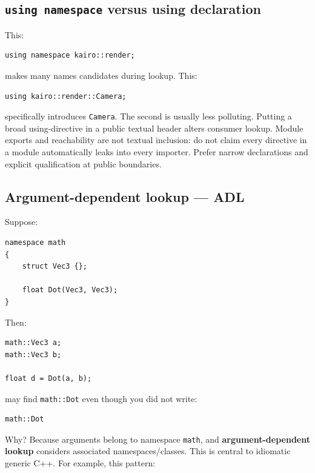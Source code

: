 \subsection{\texorpdfstring{\texttt{using\ namespace} versus using declaration}{using namespace versus using declaration}}\label{05-engine-i-ch002-using-namespace-versus-using-declaration}

This:

\begin{verbatim}
using namespace kairo::render;
\end{verbatim}

makes many names candidates during lookup. This:

\begin{verbatim}
using kairo::render::Camera;
\end{verbatim}

specifically introduces \texttt{Camera}. The second is usually less polluting. Putting a broad using-directive in a public textual header alters consumer lookup. Module exports and reachability are not textual inclusion: do not claim every directive in a module automatically leaks into every importer. Prefer narrow declarations and explicit qualification at public boundaries.

\subsection{Argument-dependent lookup --- ADL}\label{05-engine-i-ch002-argument-dependent-lookup-adl}

Suppose:

\begin{verbatim}
namespace math
{
    struct Vec3 {};

    float Dot(Vec3, Vec3);
}
\end{verbatim}

Then:

\begin{verbatim}
math::Vec3 a;
math::Vec3 b;

float d = Dot(a, b);
\end{verbatim}

may find \texttt{math::Dot} even though you did not write:

\begin{verbatim}
math::Dot
\end{verbatim}

Why? Because arguments belong to namespace \texttt{math}, and \textbf{argument-dependent lookup} considers associated namespaces/classes. This is central to idiomatic generic C++. For example, this pattern:


